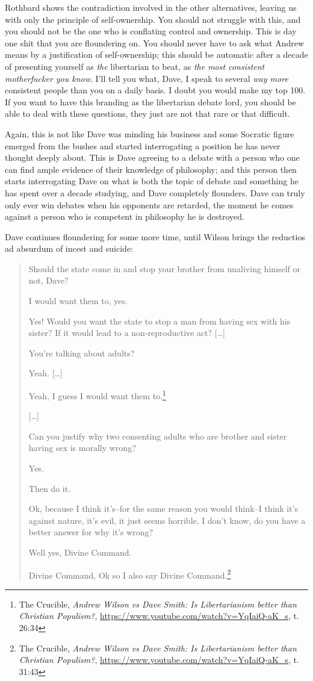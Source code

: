 \documentclass[11pt]{article}
\begin{document}
Rothbard shows the contradiction involved in the other alternatives, leaving us with only the principle of self-ownership. You should not struggle with this, and you should not be the one who is conflating control and ownership. This is day one shit that you are floundering on. You should never have to ask what Andrew means by a justification of self-ownership; this should be automatic after a decade of presenting yourself as \emph{the} libertarian to beat, as \emph{the most consistent motherfucker you know}. I'll tell you what, Dave, I speak to several \emph{way more} consistent people than you on a daily basis. I doubt you would make my top 100. If you want to have this branding as the libertarian debate lord, you should be able to deal with these questions, they just are not that rare or that difficult.

Again, this is not like Dave was minding his business and some Socratic figure emerged from the bushes and started interrogating a position he has never thought deeply about. This is Dave agreeing to a debate with a person who one can find ample evidence of their knowledge of philosophy; and this person then starts interrogating Dave on what is both the topic of debate and something he has spent over a decade studying, and Dave completely flounders. Dave can truly only ever win debates when his opponents are retarded, the moment he comes against a person who is competent in philosophy he is destroyed.

Dave continues floundering for some more time, until Wilson brings the reductios ad absurdum of incest and suicide:
\begin{quote}
Should the state come in and stop your brother from unaliving himself or not, Dave?

I would want them to, yes.

Yes! Would you want the state to stop a man from having sex with his sister? If it would lead to a non-reproductive act? [\ldots{}]

You're talking about adults?

Yeah. [\ldots{}]

Yeah, I guess I would want them to.\footnote{The Crucible, \emph{Andrew Wilson vs Dave Smith: Is Libertarianism better than Christian Populism?}, \url{https://www.youtube.com/watch?v=YqIaiQ-aK\_s}, t. 26:34}

{[}\ldots{}]

Can you justify why two consenting adults who are brother and sister having sex is morally wrong?

Yes.

Then do it.

Ok, because I think it's--for the same reason you would think--I think it's against nature, it's evil, it just seems horrible. I don't know, do you have a better answer for why it's wrong?

Well yes, Divine Command.

Divine Command, Ok so I also say Divine Command.\footnote{The Crucible, \emph{Andrew Wilson vs Dave Smith: Is Libertarianism better than Christian Populism?}, \url{https://www.youtube.com/watch?v=YqIaiQ-aK\_s}, t. 31:43}
\end{quote}
\end{document}
